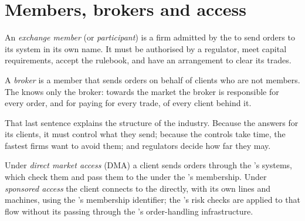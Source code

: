 \section{Members, brokers and access}

\begin{definition}\label{def:m1:exchanges-brokers-venues:member}
An \emph{exchange member} (or \emph{participant}) is a
firm admitted by the  to send orders to its system in its own name.
It must be authorised by a regulator, meet capital requirements, accept the
rulebook, and have an arrangement to clear its trades.
\end{definition}

\begin{definition}[Broker]\label{def:m1:exchanges-brokers-venues:broker}
A \emph{broker} is a member that sends orders on behalf of
clients who are not members. The  knows only the broker: towards the
market the broker is responsible for every order, and for paying for every
trade, of every client behind it.
\end{definition}

That last sentence explains the structure of the industry. Because the
 answers for its clients, it must control what they send; because the
controls take time, the fastest firms want to avoid them; and regulators
decide how far they may.

\begin{definition}\label{def:m1:exchanges-brokers-venues:dma}
Under \emph{direct market access} (DMA) a client
sends orders through the 's systems, which check them and pass them to
the  under the 's membership. Under
\emph{sponsored access} the client connects to the
 directly, with its own lines and machines, using the 's
membership identifier; the 's risk checks are applied to that flow
without its passing through the 's order-handling infrastructure.
\end{definition}


